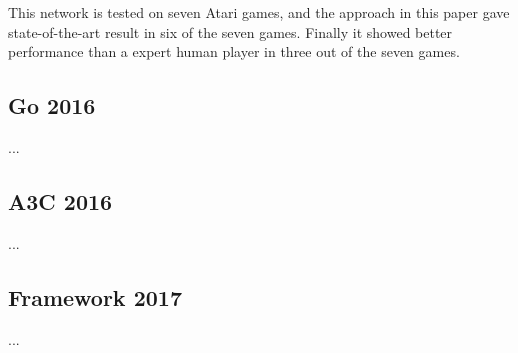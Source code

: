 This network is tested on seven Atari games, and the approach in this paper gave state-of-the-art result in six of the seven games. Finally it showed better performance than a expert human player in three out of the seven games.  

\subsection{Go 2016}
...
\subsection{A3C 2016}
...
\subsection{Framework 2017}
...